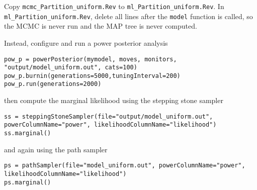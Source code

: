 \begin{enumerate}
Copy {\tt mcmc\_Partition\_uniform.Rev} to {\tt ml\_Partition\_uniform.Rev}.
In {\tt ml\_Partition\_uniform.Rev}, delete all lines after the {\tt model} function is called, so the MCMC is never run and the MAP tree is never computed.

Instead, configure and run a power posterior analysis

{\tt \begin{snugshade*}
\begin{lstlisting}
pow_p = powerPosterior(mymodel, moves, monitors, "output/model_uniform.out", cats=100)
pow_p.burnin(generations=5000,tuningInterval=200)
pow_p.run(generations=2000)
\end{lstlisting}
\end{snugshade*}}

then compute the marginal likelihood using the stepping stone sampler

{\tt \begin{snugshade*}
\begin{lstlisting}
ss = steppingStoneSampler(file="output/model_uniform.out", powerColumnName="power", likelihoodColumnName="likelihood")
ss.marginal()
\end{lstlisting}
\end{snugshade*}}

and again using the path sampler

{\tt \begin{snugshade*}
\begin{lstlisting}
ps = pathSampler(file="model_uniform.out", powerColumnName="power", likelihoodColumnName="likelihood")
ps.marginal()\end{lstlisting}
\end{snugshade*}}


%


\end{enumerate}




